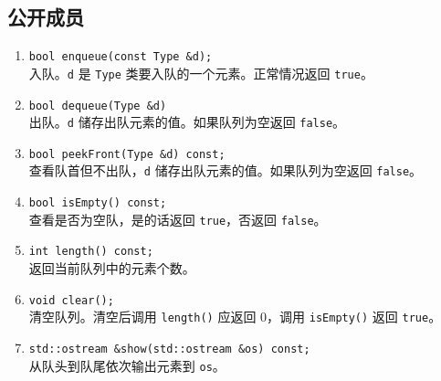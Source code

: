 {
\subsection{公开成员}
\begin{enumerate}
    \item \lstinline{bool enqueue(const Type &d);} \\
          入队。\lstinline{d} 是 \lstinline{Type} 类要入队的一个元素。正常情况返回 \lstinline{true}。
    \item \lstinline{bool dequeue(Type &d)} \\
          出队。\lstinline{d} 储存出队元素的值。如果队列为空返回 \lstinline{false}。
    \item \lstinline{bool peekFront(Type &d) const;} \\
          查看队首但不出队，\lstinline{d} 储存出队元素的值。如果队列为空返回 \lstinline{false}。\\
    \item \lstinline{bool isEmpty() const;} \\
          查看是否为空队，是的话返回 \lstinline{true}，否返回 \lstinline{false}。
    \item \lstinline{int length() const;} \\
          返回当前队列中的元素个数。\\
    \item \lstinline{void clear();} \\
          清空队列。清空后调用 \lstinline{length()} 应返回 0，调用 \lstinline{isEmpty()} 返回 \lstinline{true}。\\
    \item \lstinline{std::ostream &show(std::ostream &os) const;} \\
          从队头到队尾依次输出元素到 \lstinline{os}。\\
\end{enumerate}

}
